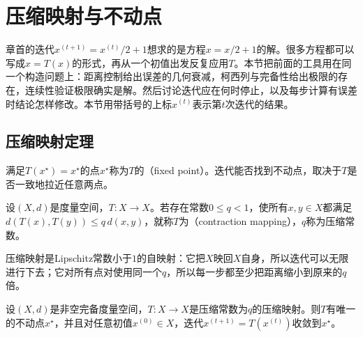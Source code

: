\section{压缩映射与不动点}
\label{sec:metric-contraction}

章首的迭代$x^{(t+1)}=x^{(t)}/2+1$想求的是方程$x=x/2+1$的解。很多方程都可以写成$x=T(x)$的形式，再从一个初值出发反复应用$T$。本节把前面的工具用在同一个构造问题上：距离控制给出误差的几何衰减，柯西列与完备性给出极限的存在，连续性验证极限确实是解。然后讨论迭代应在何时停止，以及每步计算有误差时结论怎样修改。本节用带括号的上标$x^{(t)}$表示第$t$次迭代的结果。

\subsection{压缩映射定理}
\label{sec:metric-contraction-theorem}

满足$T(x^\star)=x^\star$的点$x^\star$称为$T$的（fixed point）。迭代能否找到不动点，取决于$T$是否一致地拉近任意两点。

\begin{definition}[压缩映射]
\label{def:metric-contraction}
设$(X,d)$是度量空间，$T:X\to X$。若存在常数$0\leq q<1$，使所有$x,y\in X$都满足$d(T(x),T(y))\leq q\,d(x,y)$，就称$T$为（contraction mapping），$q$称为压缩常数。
\end{definition}

压缩映射是Lipschitz常数小于$1$的自映射：它把$X$映回$X$自身，所以迭代可以无限进行下去；它对所有点对使用同一个$q$，所以每一步都至少把距离缩小到原来的$q$倍。

\begin{theorem}[压缩映射定理]
\label{thm:metric-contraction}
设$(X,d)$是非空完备度量空间，$T:X\to X$是压缩常数为$q$的压缩映射。则$T$有唯一的不动点$x^\star$，并且对任意初值$x^{(0)}\in X$，迭代$x^{(t+1)}=T(x^{(t)})$收敛到$x^\star$。
\end{theorem}

